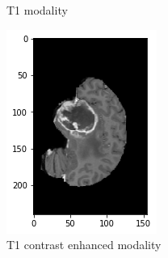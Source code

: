 \begin{figure}[H]
\begin{subfigure}[t]{.2\textwidth}
        \caption{T1 modality}
    \end{subfigure}%
    \begin{subfigure}[t]{.2\textwidth}
        \centering
        \includegraphics[width=\linewidth]{chapters/04_segmentation/images/brats/1.png}
        \caption{T1 contrast enhanced modality}
    \end{subfigure}%
    \begin{subfigure}[t]{.2\textwidth}
        \centering

\end{subfigure}
\end{figure}
